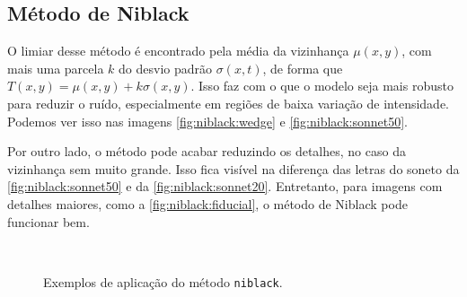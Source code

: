 \subsection{Método de Niblack}

O limiar desse método é encontrado pela média da vizinhança $\mu(x, y)$, com mais uma parcela $k$ do desvio padrão $\sigma(x, t)$, de forma que $T(x, y) = \mu(x, y) + k \sigma(x, y)$. Isso faz com o que o modelo seja mais robusto para reduzir o ruído, especialmente em regiões de baixa variação de intensidade. Podemos ver isso nas imagens \cref{fig:niblack:wedge} e \cref{fig:niblack:sonnet50}.

Por outro lado, o método pode acabar reduzindo os detalhes, no caso da vizinhança sem muito grande. Isso fica visível na diferença das letras do soneto da \cref{fig:niblack:sonnet50} e da \ref{fig:niblack:sonnet20}. Entretanto, para imagens com detalhes maiores, como a \cref{fig:niblack:fiducial}, o método de Niblack pode funcionar bem.

\begin{figure}[H]
    \centering
    \\[8pt]

    \caption{Exemplos de aplicação do método \texttt{niblack}.}
    \label{fig:niblack}
\end{figure}